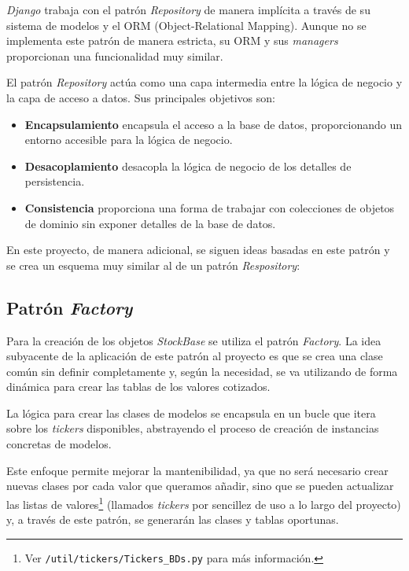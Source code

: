 \emph{Django} trabaja con el patrón \emph{Repository} de manera implícita a través de su sistema de modelos y el ORM (Object-Relational Mapping). Aunque no se implementa este patrón de manera estricta, su ORM y sus \emph{managers} proporcionan una funcionalidad muy similar.

El patrón \emph{Repository} actúa como una capa intermedia entre la lógica de negocio y la capa de acceso a datos. Sus principales objetivos son:

\begin{itemize}
\tightlist
\item 
\textbf{Encapsulamiento} encapsula el acceso a la base de datos, proporcionando un entorno accesible para la lógica de negocio.
\item
\textbf{Desacoplamiento} desacopla la lógica de negocio de los detalles de persistencia.
\item 
\textbf{Consistencia} proporciona una forma de trabajar con colecciones de objetos de dominio sin exponer detalles de la base de datos.
\end{itemize}

En este proyecto, de manera adicional, se siguen ideas basadas en este patrón y se crea un esquema muy similar al de un patrón \emph{Respository}:


\subsection{Patrón \emph{Factory}}

Para la creación de los objetos \emph{StockBase} se utiliza el patrón \emph{Factory}. La idea subyacente de la aplicación de este patrón al proyecto es que se crea una clase común sin definir completamente y, según la necesidad, se va utilizando de forma dinámica para crear las tablas de los valores cotizados. 

La lógica para crear las clases de modelos se encapsula en un bucle que itera sobre los \emph{tickers} disponibles, abstrayendo el proceso de creación de instancias concretas de modelos.

Este enfoque permite mejorar la mantenibilidad, ya que no será necesario crear nuevas clases por cada valor que queramos añadir, sino que se pueden actualizar las  listas de valores\footnote{Ver \texttt{/util/tickers/Tickers\_BDs.py} para más información.} (llamados \emph{tickers} por sencillez de uso a lo largo del proyecto) y, a través de este patrón, se generarán las clases y tablas oportunas. 

